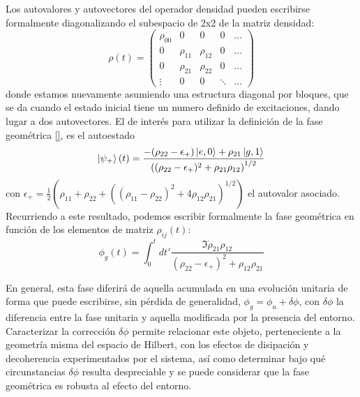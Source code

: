 Los autovalores y autovectores del operador densidad pueden escribirse formalmente  diagonalizando el subespacio de 2x2 de la matriz densidad:
\begin{equation}
    \rho(t)=\begin{pmatrix}
        \rho_{00} & 0 & 0 & 0 &\dots \\
        0 & \rho_{11} & \rho_{12} & 0 & \dots \\
        0 & \rho_{21} & \rho_{22} & 0 & \dots \\ 
        \vdots & 0 & 0 & \ddots & \dots 
    \end{pmatrix}
\end{equation}
donde estamos nuevamente asumiendo una estructura diagonal por bloques, que se da cuando el estado inicial tiene un numero definido de excitaciones, dando lugar a dos autovectores. El de interés para utilizar la definición de la fase geométrica \ref{}, es el autoestado
\begin{equation}
    \ket{\psi_+}(t)=\frac{-(\rho_{22}-\epsilon_+)\ket{e,0}+\rho_{21}\ket{g,1}}{\left((\rho_{22}-\epsilon_+)^2+\rho_{21}\rho_{12} \right)^{1/2}}
\end{equation}
con $\epsilon_+=\frac{1}{2}(\rho_{11}+\rho_{22}+((\rho_{11}-\rho_{22})^2+4\rho_{12}\rho_{21})^{1/2})$ el autovalor asociado. Recurriendo a este resultado, podemos escribir formalmente la fase geométrica en función de los elementos de matriz $\rho_{ij}(t)$:
\begin{equation}
    \phi_g(t)=\int_0^t dt' \frac{\Im \dot\rho_{21}\rho_{12}}{(\rho_{22}-\epsilon_+)^2+\rho_{12}\rho_{21}}
\end{equation}

En general, esta fase diferirá de aquella acumulada en una evolución unitaria de forma que puede
escribirse, sin pérdida de generalidad, $\phi_g=\phi_u+\delta\phi$, con $\delta\phi$ la diferencia entre la fase unitaria y
aquella modificada por la presencia del entorno. Caracterizar la corrección $\delta\phi$ permite relacionar este
objeto, perteneciente a la geometría misma del espacio de Hilbert, con los efectos de disipación y
decoherencia experimentados por el sistema, así como determinar bajo qué circunstancias $\delta\phi$ resulta
despreciable y se puede considerar que la fase geométrica es robusta al efecto del entorno.

